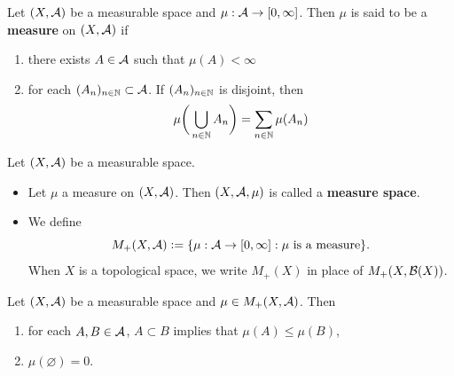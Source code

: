 \documentclass{book}
\begin{document}
	\begin{defn} 
		Let $(X, \mathcal{A})$ be a measurable space and $\mu:\mathcal{A} \rightarrow [0,\infty]$. Then $\mu$ is said to be a \textbf{measure} on $(X, \mathcal{A})$ if 
		\begin{enumerate}
			\item there exists $A \in \mathcal{A}$ such that $\mu(A)< \infty$
			\item for each $(A_n)_{n \in \mathbb{N}} \subset \mathcal{A}$. If $(A_n)_{n \in \mathbb{N}}$ is disjoint, then $$\mu\bigg(\bigcup_{n \in \mathbb{N}}A_n \bigg) = \sum\limits_{n \in \mathbb{N}}\mu(A_n)$$
		\end{enumerate}
	\end{defn}
	
	\begin{defn} 
		Let $(X,\mathcal{A})$ be a measurable space. 
		\begin{itemize}
			\item Let $\mu$ a measure on $(X, \mathcal{A})$. Then $(X, \mathcal{A}, \mu)$ is called a \textbf{measure space}. 
			\item We define 
			$$M_+(X, \mathcal{A}) \vcentcolon= \{\mu: \mathcal{A} \rightarrow [0,\infty]: \mu \text{ is a measure}\}.$$ 
			When $X$ is a topological space, we write $M_+(X)$ in place of $M_+(X, \mathcal{B}(X))$.
		\end{itemize}
	\end{defn}

	\begin{ex} 
		Let $(X,\mathcal{A})$ be a measurable space and $\mu \in M_+(X, \mathcal{A})$. Then 
		\begin{enumerate}
			\item for each $A, B \in \mathcal{A}$, $A \subset B$ implies that $\mu(A) \leq \mu(B)$,
			\item $\mu(\varnothing) = 0$.
		\end{enumerate}
	\end{ex}
	
\end{document}
